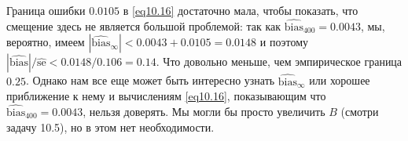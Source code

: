 Граница ошибки $0.0105$ в \ref{eq10.16} достаточно мала, чтобы показать, что смещение здесь не является большой проблемой: так как $\widehat{\text{bias}}_{400} = 0.0043$, мы, вероятно, имеем $|\widehat{\text{bias}}_{\infty}| < 0.0043 + 0.0105 = 0.0148$ и поэтому $|\widehat{\text{bias}}|/\widehat{\text{se}} < 0.0148 / 0.106 = 0.14$. Что довольно меньше, чем эмпирическое граница $0.25$. Однако нам все еще может быть интересно узнать $\widehat{\text{bias}}_{\infty}$ или хорошее приближение к нему и вычислениям \ref{eq10.16}, показывающим что $\widehat{\text{bias}}_{400} = 0.0043$, нельзя доверять. Мы могли бы просто увеличить $B$ (смотри задачу 10.5), но в этом нет необходимости.